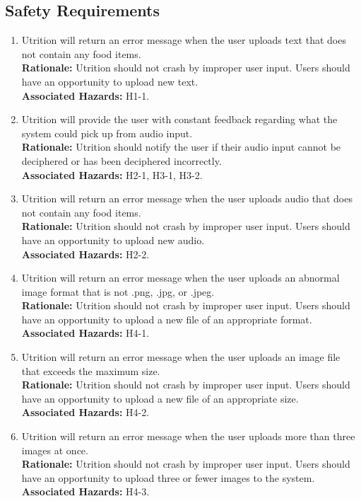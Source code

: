 \documentclass{article}
\begin{document}
\subsection{Safety Requirements}
\begin{enumerate}[{SR}1.]
	\item Utrition will return an error message when the user uploads text that does not contain any food items. \\
	\textbf{Rationale:}  Utrition should not crash by improper user 
	input. Users should have an opportunity to upload new text.\\	
	\textbf{Associated Hazards:} H1-1.
	
	\item Utrition will provide the user with constant feedback regarding what the system could pick up from audio input. \\
	\textbf{Rationale:}  Utrition should notify the user if their audio input cannot be deciphered or has been deciphered incorrectly.\\	
	\textbf{Associated Hazards:} H2-1, H3-1, H3-2.
	
	\item Utrition will return an error message when the user uploads audio that does not contain any food items. \\
	\textbf{Rationale:}  Utrition should not crash by improper user 
	input. Users should have an opportunity to upload new audio.\\	
	\textbf{Associated Hazards:} H2-2.
	
	\item Utrition will return an error message when the user uploads an abnormal 
	image format that is not .png, .jpg, or .jpeg. \\
	\textbf{Rationale:}  Utrition should not crash by improper user 
	input. Users should have an opportunity to upload a new file of an appropriate format.\\	
	\textbf{Associated Hazards:} H4-1.
	
	\item Utrition will return an error message when the user uploads an image file that exceeds the maximum size. \\
	\textbf{Rationale:}  Utrition should not crash by improper user 
	input. Users should have an opportunity to upload a new file of an appropriate size.\\	
	\textbf{Associated Hazards:} H4-2.
	
	\item Utrition will return an error message when the user uploads more than three images at once. \\
	\textbf{Rationale:}  Utrition should not crash by improper user 
	input. Users should have an opportunity to upload three or fewer images to the system.\\	
	\textbf{Associated Hazards:} H4-3.
	

\end{enumerate}
\end{document}
